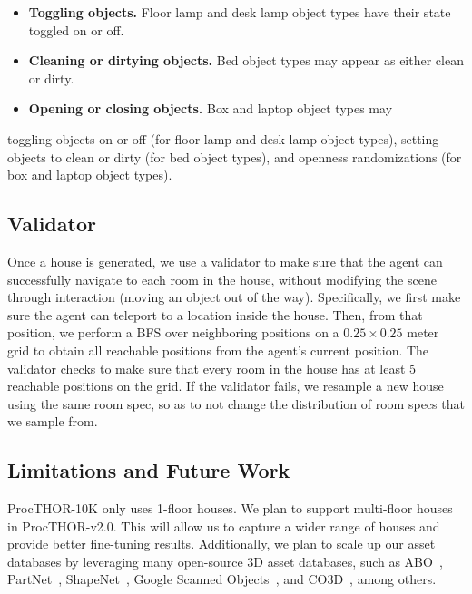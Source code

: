 \begin{itemize}[leftmargin=0.25in]
    \item \textbf{Toggling objects.} Floor lamp and desk lamp object types have their state toggled on or off.
    \item \textbf{Cleaning or dirtying objects.} Bed object types may appear as either clean or dirty.
    \item \textbf{Opening or closing objects.} Box and laptop object types may 
\end{itemize}

toggling objects on or off (for floor lamp and desk lamp object types), setting objects to clean or dirty (for bed object types), and openness randomizations (for box and laptop object types).


\subsection{Validator}

Once a house is generated, we use a validator to make sure that the agent can successfully navigate to each room in the house, without modifying the scene through interaction (\eg moving an object out of the way). Specifically, we first make sure the agent can teleport to a location inside the house. Then, from that position, we perform a BFS over neighboring positions on a $0.25\times0.25$ meter grid to obtain all reachable positions from the agent's current position. The validator checks to make sure that every room in the house has at least 5 reachable positions on the grid. If the validator fails, we resample a new house using the same room spec, so as to not change the distribution of room specs that we sample from.

\subsection{Limitations and Future Work}

ProcTHOR-10K only uses 1-floor houses. We plan to support multi-floor houses in ProcTHOR-v2.0. This will allow us to capture a wider range of houses and provide better fine-tuning results. Additionally, we plan to scale up our asset databases by leveraging many open-source 3D asset databases, such as ABO~\cite{collins2021abo}, PartNet~\cite{Mo_2019_CVPR}, ShapeNet~\cite{chang2015shapenet}, Google Scanned Objects~\cite{downs2022google}, and CO3D~\cite{reizenstein2021common}, among others.

